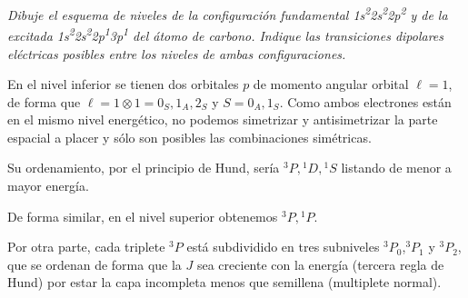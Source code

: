 \begin{tcolorbox}[halign=left]
  \emph{Dibuje el esquema de niveles de la configuración fundamental
    1s\textsuperscript{2}2s\textsuperscript{2}2p\textsuperscript{2} y
    de la excitada
    1s\textsuperscript{2}2s\textsuperscript{2}2p\textsuperscript{1}3p\textsuperscript{1}
  del átomo de carbono. Indique las transiciones dipolares eléctricas
  posibles entre los niveles de ambas configuraciones.}
\end{tcolorbox}

En el nivel inferior se tienen dos orbitales $p$ de momento angular
orbital $\ell=1$, de forma que
$\ell=1\otimes1=0_S,1_A,2_S$ y $S=0_A,1_S$. Como ambos electrones
están en el mismo nivel energético, no podemos simetrizar y
antisimetrizar la parte espacial a placer y sólo son posibles
las combinaciones simétricas.

Su ordenamiento, por el principio de Hund, sería
${}^{3}P,{}^{1}D,{}^{1}S$ listando de menor a mayor
energía\footnotemark.

De forma similar, en el nivel superior obtenemos ${}^{3}P,{}^{1}P$.

Por otra parte, cada triplete ${}^3P$ está subdividido en tres
subniveles ${}^3P_0$,${}^3P_1$ y ${}^3P_2$, que se ordenan de forma
que la $J$ sea creciente con la energía (tercera regla de Hund) por
estar la capa incompleta menos que semillena (multiplete normal).\footnotemark


